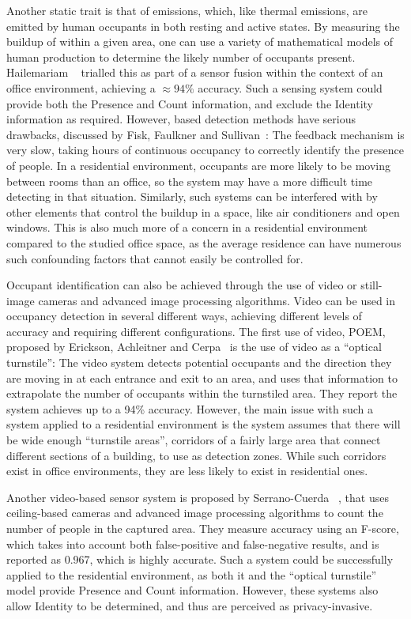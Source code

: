 \documentclass[../thesis/thesis.tex]{subfiles}
\begin{document}
Another static trait is that of \cdi emissions, which, like thermal emissions, are emitted by human occupants in both resting and active states. By measuring the buildup of \cdi within a given area, one can use a variety of mathematical models of human \cdi production to determine the likely number of occupants present. Hailemariam \etal~\cite{hailemariam2011real} trialled this as part of a sensor fusion within the context of an office environment, achieving a $\approx94\%$ accuracy. Such a sensing system could provide both the Presence and Count information, and exclude the Identity information as required. However, \cdi based detection methods have serious drawbacks, discussed by Fisk, Faulkner and Sullivan~\cite{fisk2006accuracy}: The \cdi feedback mechanism is very slow, taking hours of continuous occupancy to correctly identify the presence of people. In a residential environment, occupants are more likely to be moving between rooms than an office, so the system may have a more difficult time detecting in that situation. Similarly, such systems can be interfered with by other elements that control the \cdi buildup in a space, like air conditioners and open windows. This is also much more of a concern in a residential environment compared to the studied office space, as the average residence can have numerous such confounding factors that cannot easily be controlled for.

Occupant identification can also be achieved through the use of video or still-image cameras and advanced image processing algorithms. Video can be used in occupancy detection in several different ways, achieving different levels of accuracy and requiring different configurations. The first use of video, POEM, proposed by Erickson, Achleitner and Cerpa~\cite{erickson2013poem} is the use of video as a ``optical turnstile'': The video system detects potential occupants and the direction they are moving in at each entrance and exit to an area, and uses that information to extrapolate the number of occupants within the turnstiled area. They report the system achieves up to a 94\% accuracy. However, the main issue with such a system applied to a residential environment is the system assumes that there will be wide enough ``turnstile areas'', corridors of a fairly large area that connect different sections of a building, to use as detection zones. While such corridors exist in office environments, they are less likely to exist in residential ones.

Another video-based sensor system is proposed by Serrano-Cuerda \etal~\cite{serrano2013efficient}, that uses ceiling-based cameras and advanced image processing algorithms to count the number of people in the captured area. They measure accuracy using an F-score, which takes into account both false-positive and false-negative results, and is reported as 0.967, which is highly accurate. Such a system could be successfully applied to the residential environment, as both it and the ``optical turnstile'' model provide Presence and Count information. However, these systems also allow Identity to be determined, and thus are perceived as privacy-invasive.
\end{document}
